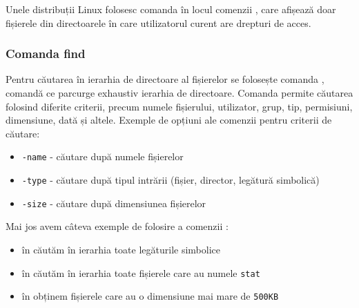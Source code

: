 Unele distribuții Linux folosesc comanda  în locul comenzii , care afișează doar fișierele din directoarele în care utilizatorul curent are drepturi de acces.

\subsubsection{Comanda find}
\label{sec:fs:find}

Pentru căutarea în ierarhia de directoare al fișierelor se folosește comanda , comandă ce parcurge exhaustiv ierarhia de directoare. Comanda permite căutarea folosind diferite criterii, precum numele fișierului, utilizator, grup, tip, permisiuni, dimensiune, dată și altele. Exemple de opțiuni ale comenzii  pentru criterii de căutare:

\begin{itemize}
  \item \texttt{-name} - căutare după numele fișierelor
  \item \texttt{-type} - căutare după tipul intrării (fișier, director, legătură simbolică)
  \item \texttt{-size} - căutare după dimensiunea fișierelor
\end{itemize}

Mai jos avem câteva exemple de folosire a comenzii :

\begin{itemize}
  \item în  căutăm în ierarhia  toate legăturile simbolice
  \item în  căutăm în ierarhia  toate fișierele care au numele \texttt{stat}
  \item în  obținem fișierele care au o dimensiune mai mare de \texttt{500KB}
\end{itemize}


